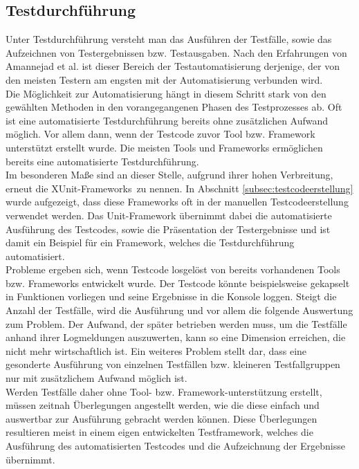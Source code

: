 \subsection{Testdurchführung}
\label{subsec:testdurchführung}
Unter Testdurchführung versteht man das Ausführen der Testfälle, sowie das Aufzeichnen von Testergebnissen bzw. Testausgaben. Nach den Erfahrungen von Amannejad et al. \cite{amannejad_search-based_2014} ist dieser Bereich der Testautomatisierung derjenige, der von den meisten Testern am engsten mit der Automatisierung verbunden wird.\\
Die Möglichkeit zur Automatisierung hängt in diesem Schritt stark von den gewählten Methoden in den vorangegangenen Phasen des Testprozesses ab. Oft ist eine automatisierte Testdurchführung bereits ohne zusätzlichen Aufwand möglich. Vor allem dann, wenn der Testcode zuvor Tool bzw. Framework unterstützt erstellt wurde.
Die meisten Tools und Frameworks ermöglichen bereits eine automatisierte Testdurchführung.\\
Im besonderen Maße sind an dieser Stelle, aufgrund ihrer hohen Verbreitung, erneut die \grq XUnit-Frameworks\grq\ zu nennen.
In Abschnitt \ref{subsec:testcodeerstellung} wurde aufgezeigt, dass diese Frameworks oft in der manuellen Testcodeerstellung verwendet werden. Das Unit-Framework übernimmt dabei die automatisierte Ausführung des Testcodes, sowie die Präsentation der Testergebnisse und ist damit ein Beispiel für ein Framework, welches die Testdurchführung automatisiert.\\
Probleme ergeben sich, wenn Testcode losgelöst von bereits vorhandenen Tools bzw. Frameworks entwickelt wurde. Der Testcode könnte beispielsweise gekapselt in Funktionen vorliegen und seine Ergebnisse in die Konsole loggen. Steigt die Anzahl der Testfälle, wird die Ausführung und vor allem die folgende Auswertung zum Problem. Der Aufwand, der später betrieben werden muss, um die Testfälle anhand ihrer Logmeldungen auszuwerten, kann so eine Dimension erreichen, die nicht mehr wirtschaftlich ist. Ein weiteres Problem stellt dar, dass eine gesonderte Ausführung von einzelnen Testfällen bzw. kleineren Testfallgruppen nur mit zusätzlichem Aufwand möglich ist.\\
Werden Testfälle daher ohne Tool- bzw. Framework-unterstützung erstellt, müssen zeitnah Überlegungen angestellt werden, wie die diese einfach und auswertbar zur Ausführung gebracht werden können.
Diese Überlegungen resultieren meist in einem eigen entwickelten Testframework, welches die Ausführung des automatisierten Testcodes und die Aufzeichnung der Ergebnisse übernimmt.



